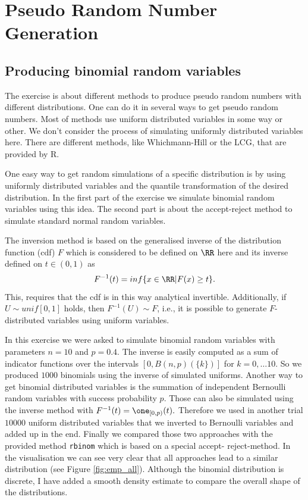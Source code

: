 \chapter{Pseudo Random Number Generation}
\section{Producing binomial random variables}

The exercise is about different methods to produce pseudo random numbers with different distributions. One can do it in several ways to get pseudo random numbers. Most of methods use uniform distributed variables in some way or other. We don't consider the process of simulating uniformly distributed variables here. There are different methods, like Whichmann-Hill or the LCG, that are provided by R. 

\noindent
One easy way to get random simulations of a specific distribution is by using uniformly distributed variables and the quantile transformation of the desired distribution. In the first part of the exercise we simulate binomial random variables using this idea. The second part is about the accept-reject method to simulate standard normal random variables.

The inversion method is based on the generalised inverse of the distribution function (cdf) $F$ which is considered to be defined on $\RR$ here and its inverse defined on $t \in (0, 1)$ as
$$F^{-1}(t) = inf\{x \in \RR | F(x) \geq t\}.$$
This, requires that the cdf is in this way analytical invertible. Additionally, if $U \sim unif[0, 1]$ holds, then $F^{-1}(U) \sim F$, i.e., it is possible to generate $F$-distributed variables using uniform variables.

In this exercise we were asked to simulate binomial random variables with parameters $n = 10$ and $p = 0.4.$ The inverse is easily computed as a sum of indicator functions over the intervals $[0,B(n,p)(\{k\})]$ for $k = 0, \dots 10.$ So we produced $1000$ binomials using the inverse of simulated uniforms. Another way to get binomial distributed variables is the summation of independent Bernoulli random variables with success
probability $p.$ Those can also be simulated using the inverse method with $F^{-1}(t) = \one_{[0,p)}(t).$ Therefore we used in another trial $10000$ uniform distributed variables that we inverted to Bernoulli variables and added up in the end. Finally we compared those
two approaches with the provided method \texttt{rbinom} which is based on a special accept-
reject-method. In the visualisation we can see very clear that all approaches lead to
a similar distribution (see Figure \ref{fig:emp_all}). Although the binomial distribution is discrete, I have added a smooth density estimate to compare the overall shape of the distributions.

